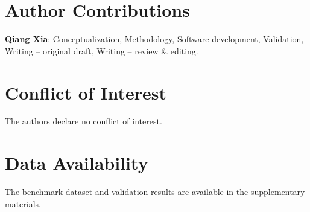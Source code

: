 \section*{Author Contributions}

\noindent\textbf{Qiang Xia}: Conceptualization, Methodology, Software development, Validation, Writing -- original draft, Writing -- review \& editing.

\section*{Conflict of Interest}

The authors declare no conflict of interest.

\section*{Data Availability}

The benchmark dataset and validation results are available in the supplementary materials.

